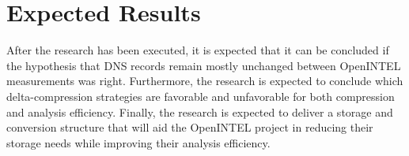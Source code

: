 \section{Expected Results}

After the research has been executed, it is expected that it can be concluded if 
the hypothesis that DNS records remain mostly unchanged between OpenINTEL measurements 
was right. Furthermore, the research is expected to conclude which delta-compression 
strategies are favorable and unfavorable for both compression and analysis efficiency.
Finally, the research is expected to deliver a storage and conversion structure that 
will aid the OpenINTEL project in reducing their storage needs while improving their 
analysis efficiency.
